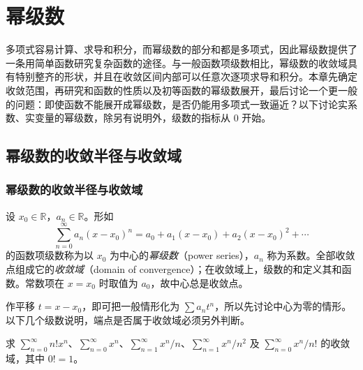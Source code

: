 \setcounter{chapter}{10} %
\chapter{幂级数}
\label{chap:power-series}

多项式容易计算、求导和积分，而幂级数的部分和都是多项式，因此幂级数提供了一条用简单函数研究复杂函数的途径。与一般函数项级数相比，幂级数的收敛域具有特别整齐的形状，并且在收敛区间内部可以任意次逐项求导和积分。本章先确定收敛范围，再研究和函数的性质以及初等函数的幂级数展开，最后讨论一个更一般的问题：即使函数不能展开成幂级数，是否仍能用多项式一致逼近？以下讨论实系数、实变量的幂级数，除另有说明外，级数的指标从 $0$ 开始。

\section{幂级数的收敛半径与收敛域}
\label{sec:radius-and-domain-of-convergence}

\subsection{幂级数的收敛半径与收敛域}
\label{subsec:radius-and-domain-of-convergence}

\begin{definition}
\label{def:real-power-series}
设 $x_0\in\mathbb R$，$a_n\in\mathbb R$。形如
\begin{equation}
    \sum_{n=0}^\infty a_n(x-x_0)^n
    =a_0+a_1(x-x_0)+a_2(x-x_0)^2+\cdots
    \label{eq:general-real-power-series}
\end{equation}
的函数项级数称为以 $x_0$ 为中心的\emph{幂级数}（power series），$a_n$ 称为系数。全部收敛点组成它的\emph{收敛域}（domain of convergence）；在收敛域上，级数的和定义其和函数。常数项在 $x=x_0$ 时取值为 $a_0$，故中心总是收敛点。
\end{definition}

作平移 $t=x-x_0$，即可把一般情形化为 $\sum a_nt^n$，所以先讨论中心为零的情形。以下几个级数说明，端点是否属于收敛域必须另外判断。

\begin{example}
\label{ex:power-series-basic-convergence-domains}
求 $\sum_{n=0}^\infty n!x^n$、$\sum_{n=0}^\infty x^n$、$\sum_{n=1}^\infty x^n/n$、$\sum_{n=1}^\infty x^n/n^2$ 及 $\sum_{n=0}^\infty x^n/n!$ 的收敛域，其中 $0!=1$。
\end{example}

